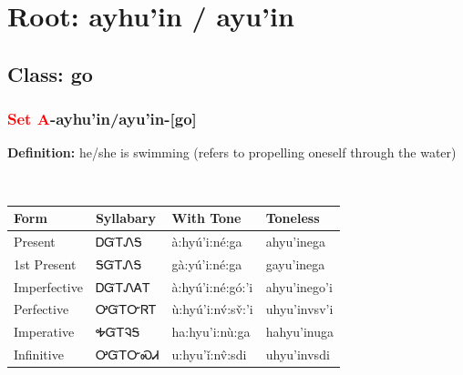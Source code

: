 \needspace{4in}
\section*{Root: ayhu'in / ayu'in}
\nopagebreak
{}
\needspace{3in}
\subsection*{Class: go}
\nopagebreak
\needspace{2in}
\subsubsection*{\textcolor{Red}{Set A}{-}\textbf{ayhu'in/ayu'in}{-}[go]}
\nopagebreak
\textbf{Definition: } he/she is swimming (refers to propelling oneself through the water)
\\[0.5em]
\begin{tabularx}{\textwidth}{l X X X}%
\toprule%
\textbf{Form}&\textbf{Syllabary}&\textbf{With Tone}&\textbf{Toneless}\\%
\midrule%
Present&ᎠᏳᎢᏁᎦ&à:hyú’i:né:ga&ahyu’inega\\%
1st Present&ᎦᏳᎢᏁᎦ&gà:yú’i:né:ga&gayu’inega\\%
Imperfective&ᎠᏳᎢᏁᎪᎢ&à:hyú’i:né:gó:’i&ahyu’inego’i\\%
Perfective&ᎤᏳᎢᏅᏒᎢ&ù:hyú’i:nv́:sv̌:’i&uhyu’invsv’i\\%
Imperative&ᎭᏳᎢᎸᎦ&ha:hyu’i:nù:ga&hahyu’inuga\\%
Infinitive&ᎤᏳᎢᏅᏍᏗ&u:hyu’ǐ:nv̂:sdi&uhyu’invsdi\\%
\bottomrule%
\end{tabularx}
\\[1em]